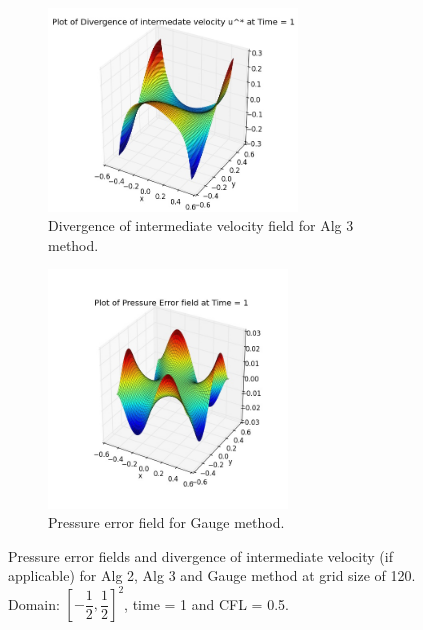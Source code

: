 \begin{figure}[H]
	\quad
	\begin{subfigure}[t]{2.6in}
		\centering
		\includegraphics[width=2.6in]{figures/Pm2_pf2b_np_div_uvstar_t_1_grid_60.jpg}
		\caption{Divergence of intermediate velocity field for Alg 3 method.}\label{fig:6.19d}
	\end{subfigure}
	\quad
	\begin{subfigure}[t]{2.5in}
		\centering
		\includegraphics[width=2.5in]{figures/Gauge_pf2b_P_error_t_1_grid_60_corrected.jpg}
		\caption{Pressure error field for Gauge method. }\label{fig:6.19d}
	\end{subfigure}
	\caption{Pressure error fields and divergence of intermediate velocity (if applicable) for Alg 2, Alg 3 and Gauge method at grid size of 120. Domain: $[-\dfrac{1}{2},\dfrac{1}{2}]^2$, time = 1 and CFL = 0.5. }\label{fig:6.16}
\end{figure}

